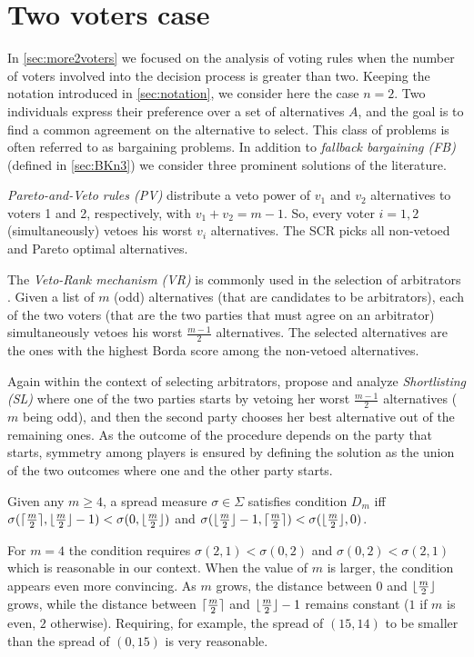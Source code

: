 \documentclass[version=3.21, pagesize, twoside=off, bibliography=totoc, DIV=calc, fontsize=12pt, a4paper]{scrartcl}
\begin{document}
\section{Two voters case}
In \cref{sec:more2voters} we focused on the analysis of voting rules when the number of voters involved into the decision process is greater than two. Keeping the notation introduced in \cref{sec:notation}, we consider here the case $n=2$. Two individuals express their preference over a set of alternatives $A$, and the goal is to find a common agreement on the alternative to select. This class of problems is often referred to as bargaining problems. In addition to \textit{fallback bargaining (FB)} \citep{Brams2001} (defined in \cref{sec:BKn3}) we consider three prominent solutions of the literature.

\textit{Pareto-and-Veto rules (PV)} \citep{Laslier2020} distribute a veto power of $v_1$ and $v_2$ alternatives to voters 1 and 2, respectively, with $v_1+v_2=m-1$. So, every voter $i=1,2$ (simultaneously) vetoes his worst $v_i$ alternatives. The \ac{SCR} picks all non-vetoed and Pareto optimal alternatives.

The \textit{Veto-Rank mechanism (VR)} is commonly used in the selection of arbitrators \citep{Clippel2014}. Given a list of $m$ (odd) alternatives (that are candidates to be arbitrators), each of the two voters (that are the two parties that must agree on an arbitrator) simultaneously vetoes his worst $\frac{m-1}{2}$ alternatives. The selected alternatives are the ones with the highest Borda score among the non-vetoed alternatives.

Again within the context of selecting arbitrators, \citet{Clippel2014} propose and analyze \textit{Shortlisting (SL)} where one of the two parties starts by vetoing her worst $\frac{m-1}{2}$ alternatives ($m$ being odd), and then the second party chooses her best alternative out of the remaining ones. As the outcome of the procedure depends on the party that starts, symmetry among players is ensured by defining the solution as the union of the two outcomes where one and the other party starts.


\begin{definition}
    Given any $m \geq 4$, a spread measure $\sigma \in \Sigma$ satisfies condition $D_m$ iff 
    $\sigma(\lceil\frac{m}{2}\rceil, \lfloor\frac{m}{2}\rfloor - 1) < \sigma(0, \lfloor\frac{m}{2}\rfloor)$ and 
    $\sigma(\lfloor\frac{m}{2}\rfloor - 1, \lceil\frac{m}{2}\rceil) < \sigma(\lfloor\frac{m}{2}\rfloor, 0)$.
\end{definition}
For $m=4$ the condition requires $\sigma(2,1) < \sigma(0,2)$ and $\sigma(0,2) < \sigma(2,1)$ which is reasonable in our context. When the value of $m$ is larger, the condition appears even more convincing. As $m$ grows, the distance between $0$ and $\lfloor\frac{m}{2}\rfloor$ grows, while the distance between $\lceil\frac{m}{2}\rceil$ and $\lfloor\frac{m}{2}\rfloor - 1$ remains constant ($1$ if $m$ is even, $2$ otherwise). Requiring, for example, the spread of $(15,14)$ to be smaller than the spread of $(0,15)$ is very reasonable.
\end{document}
